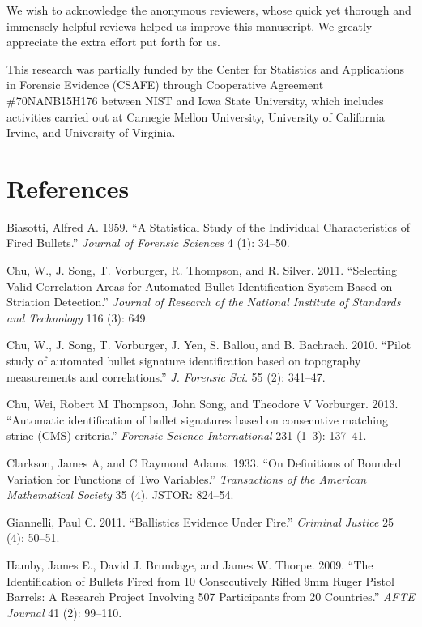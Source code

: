 \documentclass[12pt,]{article}
\theoremstyle{definition}
\theoremstyle{definition}
\theoremstyle{definition}
\theoremstyle{remark}
\begin{document}
We wish to acknowledge the anonymous reviewers, whose quick yet thorough
and immensely helpful reviews helped us improve this manuscript. We
greatly appreciate the extra effort put forth for us.

This research was partially funded by the Center for Statistics and
Applications in Forensic Evidence (CSAFE) through Cooperative Agreement
\#70NANB15H176 between NIST and Iowa State University, which includes
activities carried out at Carnegie Mellon University, University of
California Irvine, and University of Virginia.

\clearpage

\section*{References}\label{references}

\hypertarget{refs}{}
\hypertarget{ref-biasotti:1959}{}
Biasotti, Alfred A. 1959. ``A Statistical Study of the Individual
Characteristics of Fired Bullets.'' \emph{Journal of Forensic Sciences}
4 (1): 34--50.

\hypertarget{ref-chu:2011}{}
Chu, W., J. Song, T. Vorburger, R. Thompson, and R. Silver. 2011.
``Selecting Valid Correlation Areas for Automated Bullet Identification
System Based on Striation Detection.'' \emph{Journal of Research of the
National Institute of Standards and Technology} 116 (3): 649.

\hypertarget{ref-chu:2010}{}
Chu, W., J. Song, T. Vorburger, J. Yen, S. Ballou, and B. Bachrach.
2010. ``Pilot study of automated bullet signature identification based
on topography measurements and correlations.'' \emph{J. Forensic Sci.}
55 (2): 341--47.

\hypertarget{ref-thompson:2013}{}
Chu, Wei, Robert M Thompson, John Song, and Theodore V Vorburger. 2013.
``Automatic identification of bullet signatures based on consecutive
matching striae (CMS) criteria.'' \emph{Forensic Science International}
231 (1--3): 137--41.

\hypertarget{ref-clarkson1933definitions}{}
Clarkson, James A, and C Raymond Adams. 1933. ``On Definitions of
Bounded Variation for Functions of Two Variables.'' \emph{Transactions
of the American Mathematical Society} 35 (4). JSTOR: 824--54.

\hypertarget{ref-giannelli:2011}{}
Giannelli, Paul C. 2011. ``Ballistics Evidence Under Fire.''
\emph{Criminal Justice} 25 (4): 50--51.

\hypertarget{ref-hamby:2009}{}
Hamby, James E., David J. Brundage, and James W. Thorpe. 2009. ``The
Identification of Bullets Fired from 10 Consecutively Rifled 9mm Ruger
Pistol Barrels: A Research Project Involving 507 Participants from 20
Countries.'' \emph{AFTE Journal} 41 (2): 99--110.
\end{document}
